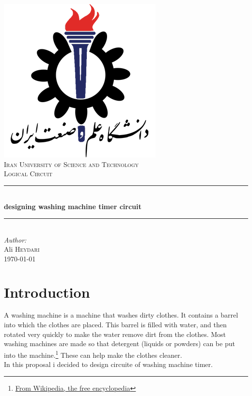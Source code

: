 \documentclass[12pt]{article}
\begin{document}
\begin{titlepage}

\newcommand{\HRule}{\rule{\linewidth}{0.5mm}} 

\center

\includegraphics[scale=0.3]{IUST_logo_color}\\[1cm]
\textsc{\Large Iran University of Science and Technology}\\[1.5cm]
\textsc{Logical Circuit }\\[0.5cm]



\HRule \\[0.4cm]
{ \huge \bfseries designing washing machine timer circuit}\\[0.4cm]
\HRule \\[1.5cm]

\Large \emph{Author:}\\
Ali \textsc{Heydari}\\[3cm]

{\large \today}\\[2cm]

\vfill

\end{titlepage}



\section{Introduction}

A washing machine is a machine that washes dirty clothes. It contains a barrel into which the clothes are placed. This barrel is filled with water, and then rotated very quickly to make the water remove dirt from the clothes. Most washing machines are made so that detergent (liquids or powders) can be put into the machine.\footnote{\href{https://simple.wikipedia.org/wiki/Washing_machine}{From Wikipedia, the free encyclopedia}} These can help make the clothes cleaner.
\\ In this proposal i decided to design circuite of washing machine timer.
\end{document}
